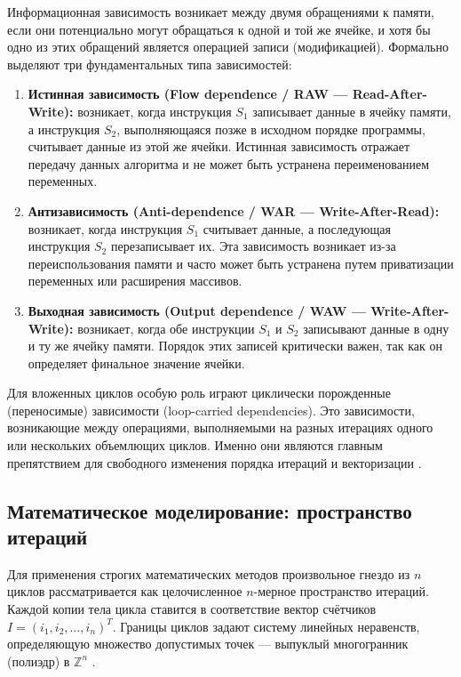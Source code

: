 \documentclass[14pt, russian]{scrartcl}
\begin{document}
Информационная зависимость возникает между двумя обращениями к памяти, если они потенциально могут обращаться к одной и той же ячейке, и хотя бы одно из этих обращений является операцией записи (модификацией). Формально выделяют три фундаментальных типа зависимостей:
\begin{enumerate}
    \item \textbf{Истинная зависимость (Flow dependence / RAW --- Read-After-Write):} возникает, когда инструкция $S_1$ записывает данные в ячейку памяти, а инструкция $S_2$, выполняющаяся позже в исходном порядке программы, считывает данные из этой же ячейки. Истинная зависимость отражает передачу данных алгоритма и не может быть устранена переименованием переменных.
    \item \textbf{Антизависимость (Anti-dependence / WAR --- Write-After-Read):} возникает, когда инструкция $S_1$ считывает данные, а последующая инструкция $S_2$ перезаписывает их. Эта зависимость возникает из-за переиспользования памяти и часто может быть устранена путем приватизации переменных или расширения массивов.
    \item \textbf{Выходная зависимость (Output dependence / WAW --- Write-After-Write):} возникает, когда обе инструкции $S_1$ и $S_2$ записывают данные в одну и ту же ячейку памяти. Порядок этих записей критически важен, так как он определяет финальное значение ячейки.
\end{enumerate}

Для вложенных циклов особую роль играют циклически порожденные (переносимые) зависимости (loop-carried dependencies). Это зависимости, возникающие между операциями, выполняемыми на разных итерациях одного или нескольких объемлющих циклов. Именно они являются главным препятствием для свободного изменения порядка итераций и векторизации \cite{aho2007dragon}.

\subsection{Математическое моделирование: пространство итераций}

Для применения строгих математических методов произвольное гнездо из $n$ циклов рассматривается как целочисленное $n$-мерное пространство итераций. Каждой копии тела цикла ставится в соответствие вектор счётчиков $I = (i_1, i_2, \dots, i_n)^T$. Границы циклов задают систему линейных неравенств, определяющую множество допустимых точек --- выпуклый многогранник (полиэдр) в $\mathbb{Z}^n$ \cite{bondhugula2008pluto}.
\end{document}
